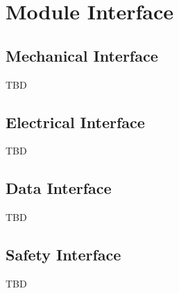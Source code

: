 \chapter{Module Interface}

\section{Mechanical Interface}

TBD

\section{Electrical Interface}

TBD

\section{Data Interface}

TBD

\section{Safety Interface}

TBD
